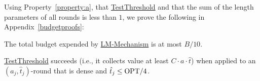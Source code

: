 Using Property~\ref{property:a}, that \hyperref[alg:TestTHRESHOLD]{TestThreshold} and that the sum of the length parameters of all rounds is less than $1$, we prove the following in Appendix~\ref{budgetproofs}:

\begin{lemma}\label{BUDGET}
The total budget expended by \hyperref[alg:LMMECH]{LM-Mechanism} is at most $B/10$.
\end{lemma}


\begin{property}\label{property:b}
\hyperref[alg:TestTHRESHOLD]{TestThreshold} succeeds (i.e., it collects value at least $C\cdot a \cdot \hat{t}$) when applied to an $\left(a_j,\hat{t}_j\right)$-round that is dense and $\hat{t}_j \le \mathrm{OPT} / 4$.
\end{property}
